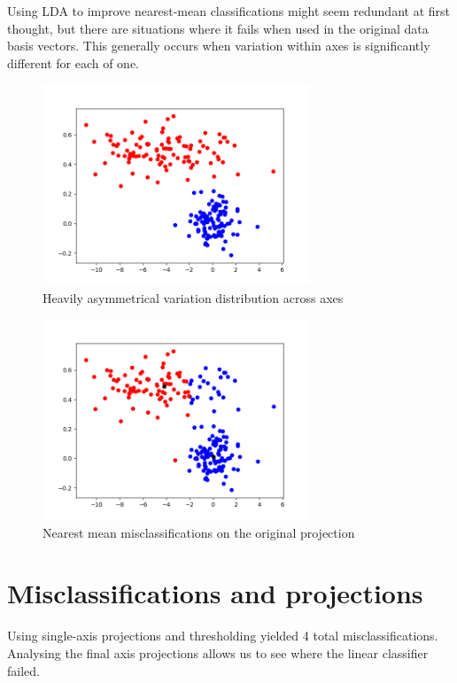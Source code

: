 \documentclass{bmvc2k}
\begin{document}
Using LDA to improve nearest-mean classifications might seem redundant at first thought, but there are situations where it fails when used in the original data basis vectors. This generally occurs when variation within axes is significantly different for each of one.

\begin{figure}[H]
   \begin{center}
      \includegraphics[width=8cm]{figures/Imbalance2D.png}
   \end{center}
   \caption{Heavily asymmetrical variation distribution across axes}
\end{figure}

\begin{figure}[H]
   \begin{center}
      \includegraphics[width=8cm]{figures/MeanMisclassification.png}
   \end{center}
   \caption{Nearest mean misclassifications on the original projection}
\end{figure}

\section{Misclassifications and projections}

Using single-axis projections and thresholding yielded 4 total misclassifications. Analysing the final axis projections allows us to see where the linear classifier failed.
\end{document}

